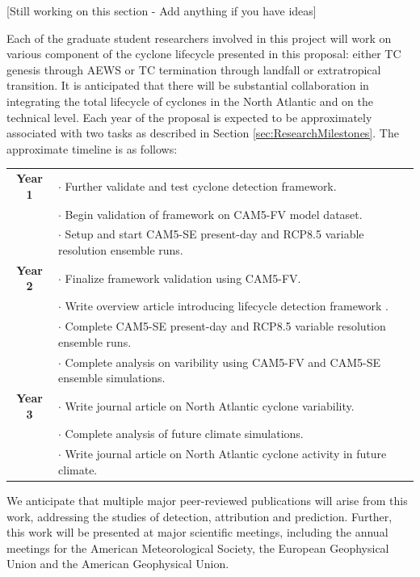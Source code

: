 \documentclass[11pt]{article}
\begin{document}
{\color{red}[Still working on this section - Add anything if you have ideas]}

Each of the graduate student researchers involved in this project will work on various component of the cyclone lifecycle presented in this proposal: either TC genesis through AEWS or TC termination through landfall or extratropical transition. It is anticipated that there will be substantial collaboration in integrating the total lifecycle of cyclones in the North Atlantic and on the technical level.  Each year of the proposal is expected to be approximately associated with two tasks as described in Section \ref{sec:ResearchMilestones}.  The approximate timeline is as follows:

\begin{tabularx}{\textwidth}{cX}
\hline
\textbf{Year 1} & $\cdot$ Further validate and test cyclone detection framework. \\
& $\cdot$ Begin validation of framework on CAM5-FV model dataset.  \\
& $\cdot$ Setup and start CAM5-SE present-day and RCP8.5 variable resolution ensemble runs. \\
\hline
\textbf{Year 2} & $\cdot$ Finalize framework validation using CAM5-FV. \\
& $\cdot$ Write overview article introducing lifecycle detection framework .\\
& $\cdot$ Complete CAM5-SE present-day and RCP8.5 variable resolution ensemble runs. \\
& $\cdot$ Complete analysis on varibility using CAM5-FV and CAM5-SE ensemble simulations. \\
\hline
\textbf{Year 3} & $\cdot$ Write journal article on North Atlantic cyclone variability. \\
& $\cdot$ Complete analysis of future climate simulations. \\
& $\cdot$ Write journal article on North Atlantic cyclone activity in future climate. \\
\hline
\end{tabularx}

We anticipate that multiple major peer-reviewed publications will arise from this work, addressing the studies of detection, attribution and prediction. Further, this work will be presented at major scientific meetings, including the annual meetings for the American Meteorological Society, the European Geophysical Union and the American Geophysical Union.

{\vbox{}}

\end{document}
